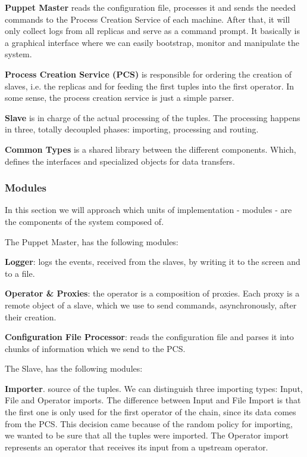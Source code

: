 \documentclass[times, 10pt,twocolumn]{article}
\begin{document}
\textbf{Puppet Master} reads the configuration file, processes it and sends the needed commands to the Process Creation Service of each machine. After that, it will only collect logs from all replicas and serve as a command prompt. It basically is a graphical interface where we can easily bootstrap, monitor and manipulate the system.

\textbf{Process Creation Service (PCS)} is responsible for ordering the creation of slaves, i.e. the replicas and for feeding the first tuples into the first operator. In some sense, the process creation service is just a simple parser.

\textbf{Slave} is in charge of the actual processing of the tuples. The processing happens in three, totally decoupled phases: importing, processing and routing. 

\textbf{Common Types} is a shared library between the different components. Which, defines the interfaces and specialized objects for data transfers.



\subsubsection{Modules}

In this section we will approach which units of implementation - modules - are the components of the system composed of.

The Puppet Master, has the following modules: 

\textbf{Logger}: logs the events, received from the slaves, by writing it to the screen and to a file.

\textbf{Operator \& Proxies}: the operator is a composition of proxies. Each proxy is a remote object of a slave, which we use to send commands, asynchronously, after their creation.

\textbf{Configuration File Processor}: reads the configuration file and parses it into chunks of information which we send to the PCS.

The Slave, has the following modules:

\textbf{Importer}. source of the tuples. We can distinguish three importing types: Input, File and Operator imports. The difference between Input and File Import is that the first one is only used for the first operator of the chain, since its data comes from the PCS. This decision came because of the random policy for importing, we wanted to be sure that all the tuples were imported. The Operator import represents an operator that receives its input from a upstream operator.
\end{document}
